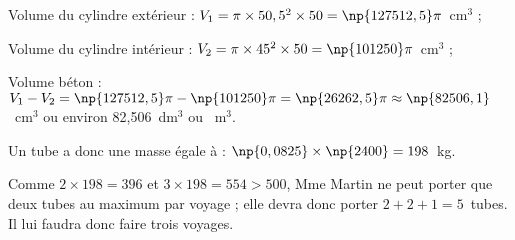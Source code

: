 
\medskip

%
%
%
%
%
%
%
Volume du cylindre extérieur  : $V_1 = \pi \times 50,5^2 \times 50 = \np{127512,5}\pi$~cm$^3$  ; 

Volume du cylindre intérieur  : $V_2 = \pi \times 45^2 \times 50 = \np{101250}\pi$~cm$^3$ ;

Volume béton : $V_1 - V_2 = \np{127512,5}\pi - \np{101250}\pi = \np{26262,5}\pi \approx \np{82506,1}$~cm$^3$ ou environ 82,506~dm$^3$ ou ~m$^3$.

Un tube a donc une masse égale à : $\np{0,0825} \times \np{2400} = 198$~kg.

Comme $2 \times 198 = 396$ et $3 \times 198 = 554 > 500$, Mme Martin ne peut porter que deux tubes au maximum par voyage  ; elle devra donc porter $2 + 2 + 1 = 5$~tubes. Il lui faudra donc faire trois voyages.

\bigskip

